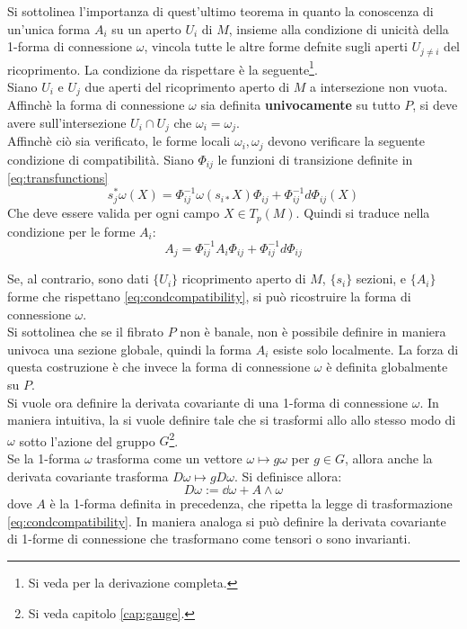 Si sottolinea l'importanza di quest'ultimo teorema in quanto la conoscenza di un'unica
forma $A_i$ su un aperto $U_i$ di $M$, insieme alla condizione di unicità della
1-forma di connessione $\omega$, vincola tutte le altre forme defnite sugli aperti
$U_{j\neq i}$ del ricoprimento. La condizione da rispettare è la seguente\footnote{
Si veda \cite{nakahara} per la derivazione completa.
}.\\

Siano $U_i$ e $U_j$ due aperti del ricoprimento aperto di $M$ a intersezione non vuota.
Affinchè la forma di connessione $\omega$ sia definita \textbf{univocamente} su tutto $P$,
si deve avere sull'intersezione $U_i \cap U_j$ che $\omega_i = \omega_j$.\\
Affinchè ciò sia verificato, le forme locali $\omega_i,\omega_j$ devono verificare
la seguente condizione di compatibilità. Siano $\Phi_{ij}$ le funzioni di transizione
definite in \ref{eq:transfunctions}
$$
   s^*_j \omega (X) = \Phi_{ij}^{-1} \omega( s_{i*} X ) \Phi_{ij}
                         + \Phi_{ij}^{-1}d\Phi_{ij}(X)
$$
Che deve essere valida per ogni campo $X \in T_p(M)$. Quindi si traduce nella
condizione per le forme $A_i$:
\begin{equation}\label{eq:condcompatibility}
   A_j = \Phi_{ij}^{-1} A_i \Phi_{ij} + \Phi_{ij}^{-1}d\Phi_{ij}
\end{equation}

Se, al contrario, sono dati $\{U_i\}$ ricoprimento aperto di $M$, $\{s_i\}$
sezioni, e $\{A_i\}$ forme che rispettano \ref{eq:condcompatibility}, si può
ricostruire la forma di connessione $\omega$.\\

Si sottolinea che se il fibrato $P$ non è banale, non è possibile definire in
maniera univoca una sezione globale, quindi la forma $A_i$ esiste solo localmente.
La forza di questa costruzione è che invece la forma di connessione $\omega$
è definita globalmente su $P$.\\

Si vuole ora definire la derivata covariante di una
1-forma di connessione $\omega$.
In maniera intuitiva, la si vuole definire tale che si trasformi allo
allo stesso modo di $\omega$ sotto l'azione del gruppo $G$\footnote{
Si veda capitolo \ref{cap:gauge}.
}.\\
Se la 1-forma $\omega$ trasforma come un vettore $\omega \mapsto g\omega$ per
$g \in G$, allora anche la derivata covariante trasforma $ D\omega \mapsto
g D\omega $. Si definisce allora:
   $$ D\omega := \dd\omega + A \wedge \omega $$
dove $A$ è la 1-forma definita in precedenza, che ripetta la legge di
trasformazione \ref{eq:condcompatibility}. In maniera analoga si può definire la
derivata covariante di 1-forme di connessione che trasformano come tensori o sono
invarianti.

